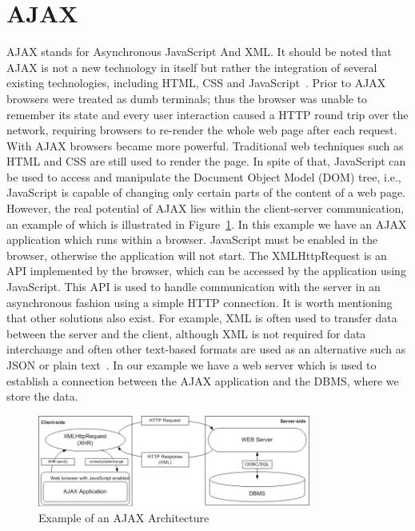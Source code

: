 \section{AJAX}
\label{sec:ajax}
AJAX stands for Asynchronous JavaScript And XML. It should be noted
that AJAX is not a new technology in itself but rather the integration of several 
existing technologies, including HTML, CSS and JavaScript~\cite{w3}. Prior to AJAX browsers 
were treated 
as dumb terminals; thus the browser was unable to remember its state and every 
user interaction caused a HTTP round trip over the network, requiring browsers 
to re-render the whole web page after each request. With AJAX browsers became 
more powerful. Traditional web techniques such as HTML and CSS are still used to 
render the page. In spite of that, JavaScript can be used to access 
and manipulate the Document Object Model (DOM) tree, i.e., 
JavaScript is capable of changing only certain parts
of the content of a web page. However, the
real potential of AJAX lies within the client-server communication, an example
of which is illustrated in Figure~\ref{fig:ajax01}. In this example we have an AJAX application
which runs within a browser. JavaScript must be enabled in the browser, otherwise
the application will not start.  
The XMLHttpRequest is an API implemented by the browser,
which can be accessed by the application using JavaScript. This API is 
used to handle communication with the server in an asynchronous fashion using a
simple HTTP connection. It is worth mentioning that other solutions also exist. 
For example, XML is often used to transfer data between the server and the client, 
although XML is not required for data interchange and often other text-based
formats are used as an alternative such as JSON or plain text~\cite{bajax1}. In our example we have 
a web server which is used to establish a connection between the AJAX application and
the DBMS, where we store the data.

\begin{figure}[h]
	\begin{center}
		\includegraphics[width=0.8\textwidth]{./img/ajax01a.png}
		\caption{Example of an AJAX Architecture}
		\label{fig:ajax01}
	\end{center}
\end{figure}

